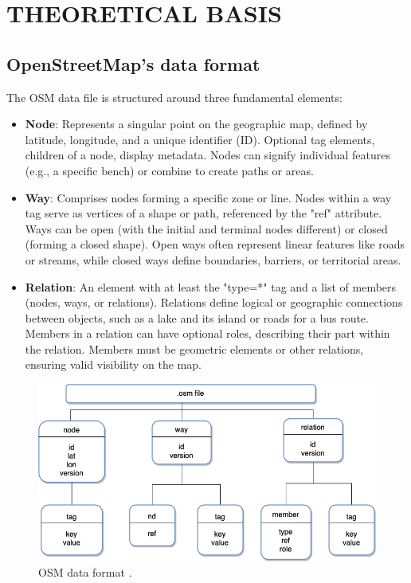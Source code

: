 \section{THEORETICAL BASIS}

\subsection{OpenStreetMap's data format}

The OSM data file is structured around three fundamental elements:

\begin{itemize}
    \item \textbf{Node}: Represents a singular point on the geographic map, defined by latitude, longitude, and a unique identifier (ID). Optional tag elements, children of a node, display metadata. Nodes can signify individual features (e.g., a specific bench) or combine to create paths or areas.
    \item \textbf{Way}: Comprises nodes forming a specific zone or line. Nodes within a way tag serve as vertices of a shape or path, referenced by the "ref" attribute. Ways can be open (with the initial and terminal nodes different) or closed (forming a closed shape). Open ways often represent linear features like roads or streams, while closed ways define boundaries, barriers, or territorial areas.
    \item \textbf{Relation}: An element with at least the "type=*" tag and a list of members (nodes, ways, or relations). Relations define logical or geographic connections between objects, such as a lake and its island or roads for a bus route. Members in a relation can have optional roles, describing their part within the relation. Members must be geometric elements or other relations, ensuring valid visibility on the map.
\end{itemize}

\begin{figure}[H]
    \centering
    \includegraphics[width=\textwidth]{assets/images/Research/System/osm_file_structure.png}
    \caption{OSM data format \cite{osm_file_structure}.}
    \label{fig:osm}
\end{figure}

